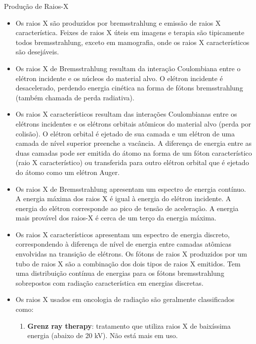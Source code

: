 \documentclass[11pt,a4paper]{article}
\newcounter{exemplo}
\begin{document}
\begin{exemplo}

	\textcolor{CarnationPink}{Produção de Raios-X}
    \begin{itemize}
        \item Os raios X são produzidos por bremsstrahlung e emissão de raios X característica. Feixes de raios X úteis em imagens e terapia são tipicamente todos bremsstrahlung, exceto em mamografia, onde os raios X característicos são desejáveis.
        
		\item Os raios X de Bremsstrahlung resultam da interação Coulombiana entre o elétron incidente e os núcleos do material alvo. O elétron incidente é desacelerado, perdendo energia cinética na forma de fótons bremsstrahlung (também chamada de perda radiativa).
		
		\item Os raios X característicos resultam das interações Coulombianas entre os elétrons incidentes e os elétrons orbitais atômicos do material alvo (perda por colisão). O elétron orbital é ejetado de sua camada e um elétron de uma camada de nível superior preenche a vacância. A diferença de energia entre as duas camadas pode ser emitida do átomo na forma de um fóton característico (raio X característico) ou transferida para outro elétron orbital que é ejetado do átomo como um elétron Auger.
		
		\item Os raios X de Bremsstrahlung apresentam um espectro de energia contínuo. A energia máxima dos raios X é igual à energia do elétron incidente. A energia do elétron corresponde ao pico de tensão de aceleração. A energia mais provável dos raios-X é cerca de um terço da energia máxima. 
		
		\item Os raios X característicos apresentam um espectro de energia discreto, correspondendo à diferença de nível de energia entre camadas atômicas envolvidas na transição de elétrons. Os fótons de raios X produzidos por um tubo de raios X são a combinação dos dois tipos de raios X emitidos. Tem uma distribuição contínua de energias para os fótons bremsstrahlung sobrepostos com radiação característica em energias discretas.
		
		\item Os raios X usados em oncologia de radiação são geralmente classificados como:
		
			\begin{enumerate}
				\item \textbf{Grenz ray therapy}: tratamento que utiliza raios X de baixíssima energia (abaixo de 20 kV). Não está mais em uso.
				

\end{enumerate}
\end{itemize}
\end{exemplo}
\end{document}
